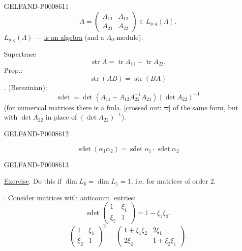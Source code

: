 \begin{GelfandAdjacentEvidence}{GELFAND-P000861}{1}
\[
A=\begin{pmatrix}A_{11}&A_{12}\\A_{21}&A_{22}\end{pmatrix}\in L_{p,q}(\Lambda).
\]
\(L_{p,q}(\Lambda)\) — \uline{is an algebra} (and a \(\Lambda_0\)-module).

Supertrace
\[
\operatorname{str} A=\operatorname{tr} A_{11}-\operatorname{tr} A_{22}.\tag{5}
\]
Prop.:
\[
\operatorname{str}(AB)=\operatorname{str}(BA)\tag{6}
\]
. (Berezinian):
\[
\operatorname{sdet}=\det(A_{11}-A_{12}A_{22}^{-1}A_{21})(\det A_{22})^{-1}\tag{7}
\]
(for numerical matrices there is a fmla. [crossed out: \sout{…}] of the same form, but with
\(\det A_{22}\) in place of \((\det A_{22})^{-1}\)).
\end{GelfandAdjacentEvidence}
\begin{GelfandAdjacentEvidence}{GELFAND-P000861}{2}

\[
\operatorname{sdet}(\alpha_1\alpha_2)=
\operatorname{sdet}\alpha_1\cdot\operatorname{sdet}\alpha_2\tag{8}
\]
\end{GelfandAdjacentEvidence}
\begin{GelfandAdjacentEvidence}{GELFAND-P000861}{3}


\uline{Exercise}. Do this if \(\dim L_0=\dim L_1=1\), i.e. for matrices of order 2.

. Consider matrices with anticomm. entries:
\[
\operatorname{sdet}\begin{pmatrix}1&\xi_1\\\xi_2&1\end{pmatrix}
 =1-\xi_1\xi_2.
\]
\[
\begin{pmatrix}1&\xi_1\\\xi_2&1\end{pmatrix}^{2}
=\begin{pmatrix}1+\xi_1\xi_2&2\xi_1\\2\xi_2&1+\xi_2\xi_1\end{pmatrix}.
\]
\end{GelfandAdjacentEvidence}
